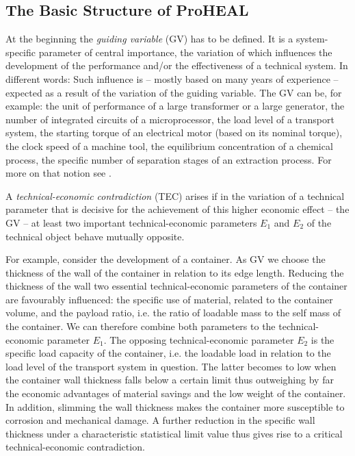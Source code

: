 \documentclass[11pt,a4paper]{article}
\begin{document}
\subsection{The Basic Structure of ProHEAL}
  
At the beginning the \emph{guiding variable} (GV) has to be defined. It is a
system-specific parameter of central importance, the variation of which
influences the development of the performance and/or the effectiveness of a
technical system. In different words: Such influence is -- mostly based on
many years of experience -- expected as a result of the variation of the
guiding variable. The GV can be, for example: the unit of performance of a
large transformer or a large generator, the number of integrated circuits of a
microprocessor, the load level of a transport system, the starting torque of
an electrical motor (based on its nominal torque), the clock speed of a
machine tool, the equilibrium concentration of a chemical process, the
specific number of separation stages of an extraction process.  For more on
that notion see \cite[(2.3.4)]{RM-21}.

A \emph{technical-economic contradiction} (TEC) arises if in the variation of
a technical parameter that is decisive for the achievement of this higher
economic effect -- the GV -- at least two important technical-economic
parameters $E_1$ and $E_2$ of the technical object behave mutually opposite.

For example, consider the development of a container. As GV we choose the
thickness of the wall of the container in relation to its edge length.
Reducing the thickness of the wall two essential technical-economic parameters
of the container are favourably influenced: the specific use of material,
related to the container volume, and the payload ratio, i.e. the ratio of
loadable mass to the self mass of the container.  We can therefore combine
both parameters to the technical-economic parameter $E_1$. The opposing
technical-economic parameter $E_2$ is the specific load capacity of the
container, i.e. the loadable load in relation to the load level of the
transport system in question. The latter becomes to low when the container
wall thickness falls below a certain limit thus outweighing by far the
economic advantages of material savings and the low weight of the container.
In addition, slimming the wall thickness makes the container more susceptible
to corrosion and mechanical damage. A further reduction in the specific wall
thickness under a characteristic statistical limit value thus gives rise to a
critical technical-economic contradiction.
\end{document}
